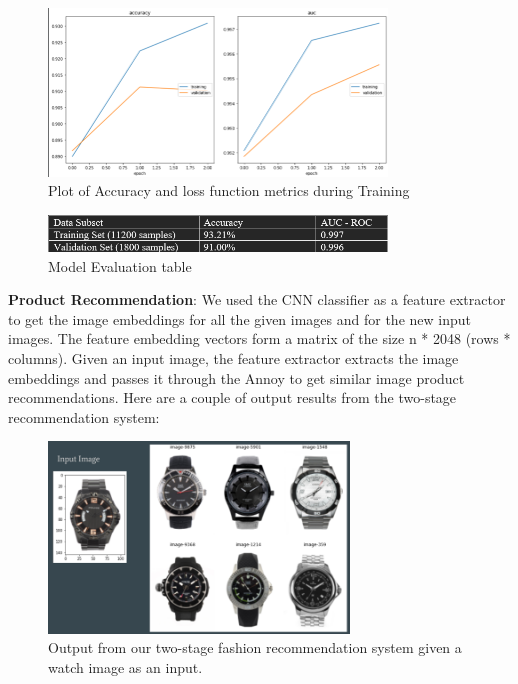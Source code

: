 \documentclass[12pt,twocolumn,letterpaper,Times New Roman]{article}
\begin{document}
\begin{figure}[!h]
    \centering
    \includegraphics[width=90mm]{fig_3.png}
    \caption{Plot of Accuracy and loss function metrics during Training}
    \label{fig:13}
\end{figure}

\begin{figure}[!h]
    \centering
    \includegraphics[width=90mm]{fig_8.png}
    \caption{Model Evaluation table}
    \label{fig:13}
\end{figure}

\textbf{Product Recommendation}: We used the CNN classifier as a feature extractor to get the image embeddings for all the given images and for the new input images. The feature embedding vectors form a matrix of the size    n * 2048 (rows * columns). Given an input image, the feature extractor extracts the image embeddings and passes it through the Annoy to get similar image product recommendations. Here are a couple of output results from the two-stage recommendation system:

\begin{figure}[!h]
    \centering
    \includegraphics[width=80mm]{fig_5.png}
    \caption{Output from our two-stage fashion recommendation system given a watch image as an input.}
    \label{fig:14}
\end{figure}
\end{document}
